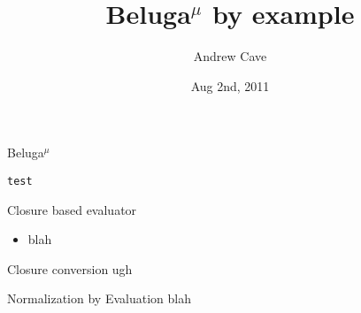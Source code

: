 \documentclass{beamer}
\title[]{Beluga$^\mu$ by example}
\author{Andrew Cave}
\date{Aug 2nd, 2011}
\begin{document}
\begin{frame}
\titlepage
\end{frame}

\begin{frame}[fragile]{Beluga$^\mu$}
\begin{lstlisting}
test
\end{lstlisting}
\end{frame}

\begin{frame}[fragile]{Closure based evaluator}
\begin{itemize}
\item blah
\end{itemize}
\end{frame}

\begin{frame}[fragile]{Closure conversion}
ugh
\end{frame}

\begin{frame}[fragile]{Normalization by Evaluation}
blah
\end{frame}
\end{document}
